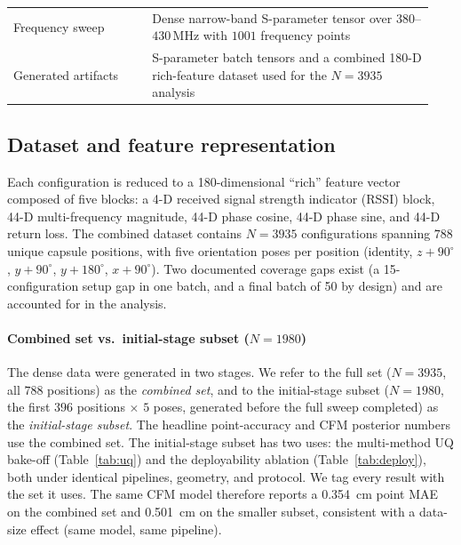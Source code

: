 \begin{table}[t]
\begin{tabular}{@{}p{0.31\linewidth}>{\raggedright\arraybackslash}p{0.63\linewidth}@{}}
	Frequency sweep & Dense narrow-band S-parameter tensor over $380$--$430$\,MHz with $1001$ frequency points \\ %
Generated artifacts & S-parameter batch tensors and a combined 180-D rich-feature dataset used for the $N=3935$ analysis \\ %
\bottomrule
\end{tabular}
\end{table}

\subsection{Dataset and feature representation}
Each configuration is reduced to a \SI{180}{}-dimensional ``rich'' feature vector
composed of five blocks: a 4-D received signal strength indicator (RSSI) block,
44-D multi-frequency magnitude, 44-D phase cosine, 44-D phase sine, and 44-D
return loss. The combined dataset contains $N=3935$ configurations spanning
$788$ unique capsule positions, with five orientation poses per position
(identity, $z{+}90^\circ$, $y{+}90^\circ$, $y{+}180^\circ$, $x{+}90^\circ$).
Two documented coverage gaps exist (a 15-configuration setup gap in one batch,
and a final batch of 50 by design) and are accounted for in the analysis.

\paragraph*{Combined set vs.\ initial-stage subset ($N=1980$)}
The dense data were generated in two stages. We refer to the full set
($N=3935$, all $788$ positions) as the \emph{combined set}, and to the
initial-stage subset ($N=1980$, the first $396$ positions $\times$ $5$ poses,
generated before the full sweep completed) as the \emph{initial-stage subset}.
The headline point-accuracy and CFM posterior numbers use the combined set. The
initial-stage subset has two uses: the multi-method UQ bake-off
(Table~\ref{tab:uq}) and the deployability ablation (Table~\ref{tab:deploy}),
both under identical pipelines, geometry, and protocol. We tag every result with
the set it uses. The same CFM model therefore reports a \SI{0.354}{cm} point MAE
on the combined set and \SI{0.501}{cm} on the smaller subset, consistent with a
data-size effect (same model, same pipeline).

